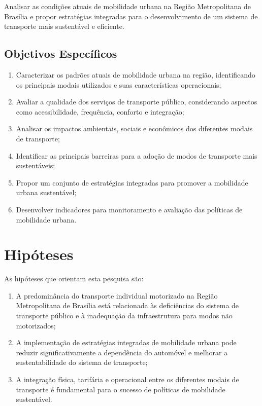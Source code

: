 Analisar as condições atuais de mobilidade urbana na Região Metropolitana de Brasília e propor estratégias integradas para o desenvolvimento de um sistema de transporte mais sustentável e eficiente.

\subsection{Objetivos Específicos}

\begin{enumerate}
    \item Caracterizar os padrões atuais de mobilidade urbana na região, identificando os principais modais utilizados e suas características operacionais;
    
    \item Avaliar a qualidade dos serviços de transporte público, considerando aspectos como acessibilidade, frequência, conforto e integração;
    
    \item Analisar os impactos ambientais, sociais e econômicos dos diferentes modais de transporte;
    
    \item Identificar as principais barreiras para a adoção de modos de transporte mais sustentáveis;
    
    \item Propor um conjunto de estratégias integradas para promover a mobilidade urbana sustentável;
    
    \item Desenvolver indicadores para monitoramento e avaliação das políticas de mobilidade urbana.
\end{enumerate}

\section{Hipóteses}

As hipóteses que orientam esta pesquisa são:

\begin{enumerate}
    \item A predominância do transporte individual motorizado na Região Metropolitana de Brasília está relacionada às deficiências do sistema de transporte público e à inadequação da infraestrutura para modos não motorizados;
    
    \item A implementação de estratégias integradas de mobilidade urbana pode reduzir significativamente a dependência do automóvel e melhorar a sustentabilidade do sistema de transporte;
    
    \item A integração física, tarifária e operacional entre os diferentes modais de transporte é fundamental para o sucesso de políticas de mobilidade sustentável.
\end{enumerate}

